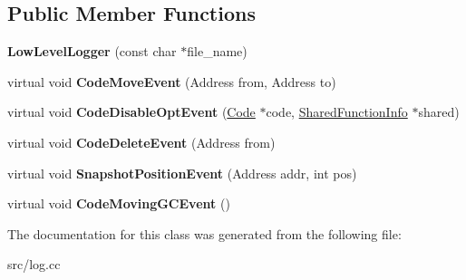 \subsection*{Public Member Functions}
\begin{DoxyCompactItemize}
\item 
\hypertarget{classv8_1_1internal_1_1_low_level_logger_aec5d6b4808216e7df1fac664b54ebf76}{}{\bfseries Low\+Level\+Logger} (const char $\ast$file\+\_\+name)\label{classv8_1_1internal_1_1_low_level_logger_aec5d6b4808216e7df1fac664b54ebf76}

\item 
\hypertarget{classv8_1_1internal_1_1_low_level_logger_af560e76b92be225e0ff09a7beb6defda}{}virtual void {\bfseries Code\+Move\+Event} (Address from, Address to)\label{classv8_1_1internal_1_1_low_level_logger_af560e76b92be225e0ff09a7beb6defda}

\item 
\hypertarget{classv8_1_1internal_1_1_low_level_logger_ad4d7e0567723ee493af1c53dee0089de}{}virtual void {\bfseries Code\+Disable\+Opt\+Event} (\hyperlink{classv8_1_1internal_1_1_code}{Code} $\ast$code, \hyperlink{classv8_1_1internal_1_1_shared_function_info}{Shared\+Function\+Info} $\ast$shared)\label{classv8_1_1internal_1_1_low_level_logger_ad4d7e0567723ee493af1c53dee0089de}

\item 
\hypertarget{classv8_1_1internal_1_1_low_level_logger_acbd8d862bcc0430fd9b636901cc368fa}{}virtual void {\bfseries Code\+Delete\+Event} (Address from)\label{classv8_1_1internal_1_1_low_level_logger_acbd8d862bcc0430fd9b636901cc368fa}

\item 
\hypertarget{classv8_1_1internal_1_1_low_level_logger_ac590f19db4fd0bf03012dc9fbeada3fd}{}virtual void {\bfseries Snapshot\+Position\+Event} (Address addr, int pos)\label{classv8_1_1internal_1_1_low_level_logger_ac590f19db4fd0bf03012dc9fbeada3fd}

\item 
\hypertarget{classv8_1_1internal_1_1_low_level_logger_aa33b0cfccb14c1dcfe8affe9ec0be3e3}{}virtual void {\bfseries Code\+Moving\+G\+C\+Event} ()\label{classv8_1_1internal_1_1_low_level_logger_aa33b0cfccb14c1dcfe8affe9ec0be3e3}

\end{DoxyCompactItemize}


The documentation for this class was generated from the following file\+:\begin{DoxyCompactItemize}
\item 
src/log.\+cc\end{DoxyCompactItemize}
